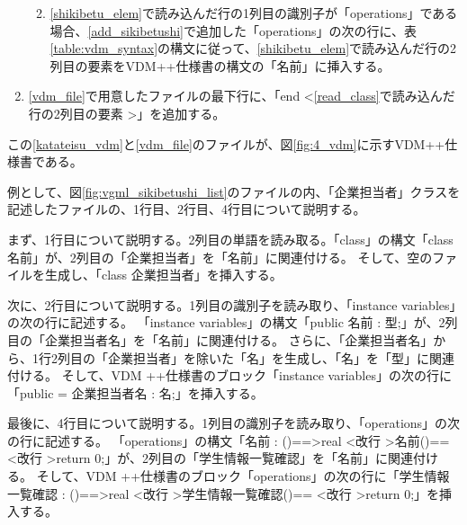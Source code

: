 \begin{enumerate}
\begin{enumerate}
\begin{enumerate}
                \end{enumerate}
            \item \ref{shikibetu_elem}で読み込んだ行の1列目の識別子が「operations」である場合、\ref{add_sikibetushi}で追加した「operations」の次の行に、表{\ref{table:vdm_syntax}}の構文に従って、\ref{shikibetu_elem}で読み込んだ行の2列目の要素をVDM++仕様書の構文の「名前」に挿入する。
        \end{enumerate}
    \item \ref{vdm_file}で用意したファイルの最下行に、「end \textless \ref{read_class}で読み込んだ行の2列目の要素 \textgreater」を追加する。
\end{enumerate}

この\ref{katateisu_vdm}と\ref{vdm_file}のファイルが、図\ref{fig:4_vdm}に示すVDM++仕様書である。

例として、図\ref{fig:vgml_sikibetushi_list}のファイルの内、「企業担当者」クラスを記述したファイルの、1行目、2行目、4行目について説明する。

まず、1行目について説明する。2列目の単語を読み取る。「class」の構文「class 名前」が、2列目の「企業担当者」を「名前」に関連付ける。
そして、空のファイルを生成し、「class 企業担当者」を挿入する。

次に、2行目について説明する。1列目の識別子を読み取り、「instance variables」の次の行に記述する。
「instance variables」の構文「public 名前 : 型;」が、2列目の「企業担当者名」を「名前」に関連付ける。
さらに、「企業担当者名」から、1行2列目の「企業担当者」を除いた「名」を生成し、「名」を「型」に関連付ける。
そして、VDM ++仕様書のブロック「instance variables」の次の行に「public  = 企業担当者名 : 名;」を挿入する。

最後に、4行目について説明する。1列目の識別子を読み取り、「operations」の次の行に記述する。
「operations」の構文「名前 : ()==\textgreater real \textless 改行 \textgreater 名前()== \textless 改行 \textgreater return 0;」が、2列目の「学生情報一覧確認」を「名前」に関連付ける。
そして、VDM ++仕様書のブロック「operations」の次の行に「学生情報一覧確認 : ()==\textgreater real \textless 改行 \textgreater 学生情報一覧確認()== \textless 改行 \textgreater return 0;」を挿入する。
